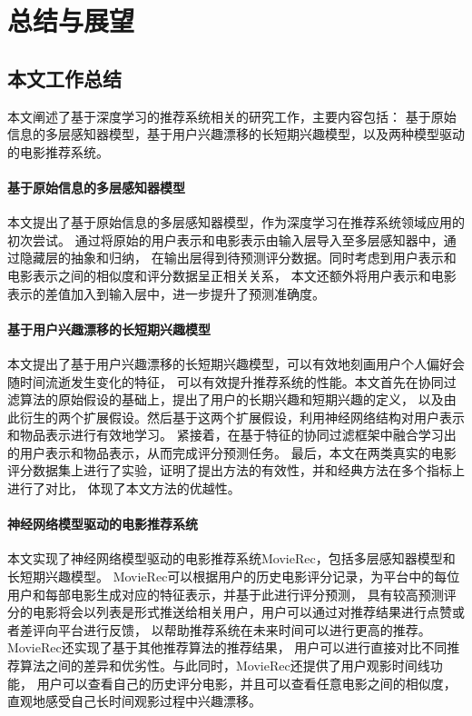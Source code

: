 \chapter{总结与展望}
\section{本文工作总结}
本文阐述了基于深度学习的推荐系统相关的研究工作，主要内容包括：
基于原始信息的多层感知器模型，基于用户兴趣漂移的长短期兴趣模型，以及两种模型驱动的电影推荐系统。

\subsubsection{基于原始信息的多层感知器模型}
本文提出了基于原始信息的多层感知器模型，作为深度学习在推荐系统领域应用的初次尝试。
通过将原始的用户表示和电影表示由输入层导入至多层感知器中，通过隐藏层的抽象和归纳，
在输出层得到待预测评分数据。同时考虑到用户表示和电影表示之间的相似度和评分数据呈正相关关系，
本文还额外将用户表示和电影表示的差值加入到输入层中，进一步提升了预测准确度。

\subsubsection{基于用户兴趣漂移的长短期兴趣模型}
本文提出了基于用户兴趣漂移的长短期兴趣模型，可以有效地刻画用户个人偏好会随时间流逝发生变化的特征，
可以有效提升推荐系统的性能。本文首先在协同过滤算法的原始假设的基础上，提出了用户的长期兴趣和短期兴趣的定义，
以及由此衍生的两个扩展假设。然后基于这两个扩展假设，利用神经网络结构对用户表示和物品表示进行有效地学习。
紧接着，在基于特征的协同过滤框架中融合学习出的用户表示和物品表示，从而完成评分预测任务。
最后，本文在两类真实的电影评分数据集上进行了实验，证明了提出方法的有效性，并和经典方法在多个指标上进行了对比，
体现了本文方法的优越性。

\subsubsection{神经网络模型驱动的电影推荐系统}
本文实现了神经网络模型驱动的电影推荐系统MovieRec，包括多层感知器模型和长短期兴趣模型。
MovieRec可以根据用户的历史电影评分记录，为平台中的每位用户和每部电影生成对应的特征表示，并基于此进行评分预测，
具有较高预测评分的电影将会以列表是形式推送给相关用户，用户可以通过对推荐结果进行点赞或者差评向平台进行反馈，
以帮助推荐系统在未来时间可以进行更高的推荐。MovieRec还实现了基于其他推荐算法的推荐结果，
用户可以进行直接对比不同推荐算法之间的差异和优劣性。与此同时，MovieRec还提供了用户观影时间线功能，
用户可以查看自己的历史评分电影，并且可以查看任意电影之间的相似度，直观地感受自己长时间观影过程中兴趣漂移。

